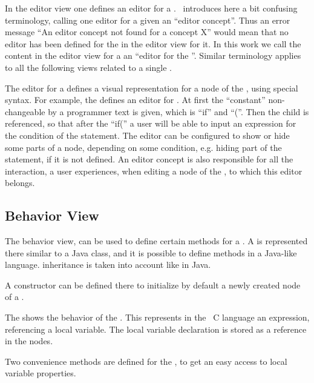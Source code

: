 In the editor view one defines an editor for a . \jbmps\ introduces here a bit confusing terminology, calling one editor for a given
 an ``editor concept''. Thus an error message ``An editor concept not found for a concept X'' would mean that no editor
has been defined for the   in the editor view for it. In this work we call the content in the editor view for a   an 
``editor for the  ''. Similar terminology applies to all the following views related to a single .

The editor for a  defines a visual representation for a node of the , using special syntax. For example, the 
 defines an editor for . At first the ``constant'' non-changeable by a programmer text is given, which is ``if'' and ``(''. Then
the child  is referenced, so that after the ``if('' a user will be able to input an expression for the condition of the  statement.
The editor can be configured to show or hide some parts of a node, depending on some condition, e.g. hiding  part of the  statement, if it 
is not defined. An editor concept is also responsible for all the interaction, a user experiences, when editing a node of the , 
to which this editor belongs.

\subsection{Behavior View}

The behavior view, can be used to define certain methods for a . A  is represented there similar to a Java class, and
it is possible to define methods in a Java-like language.  inheritance is taken into account like in Java. 

A  constructor can be defined there to initialize by default a newly created node of a .


The  shows the behavior of the  . This  represents in the
\mbp\ C language an expression, referencing a local variable. The local variable declaration is stored as a reference 
in the  nodes.

Two convenience methods are defined for the  , to get an easy access to local variable properties.


